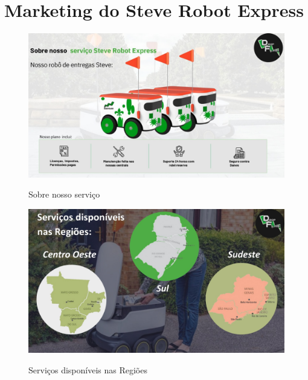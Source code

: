 \chapter{Marketing do Steve Robot Express}
\label{ch:identificador}

\begin{figure} [!ht]
    \centering
    \caption{Sobre nosso serviço}
    \includegraphics[width=1.0\linewidth]{figuras/mark1.jpeg}
    \label{fig:enter-label}
\end{figure}

\begin{figure} [!ht]
    \centering
    \caption{Serviços disponíveis nas Regiões}
    \includegraphics[width=1.0\linewidth]{figuras/mark2.jpeg}
    \label{fig:enter-label}
\end{figure}

